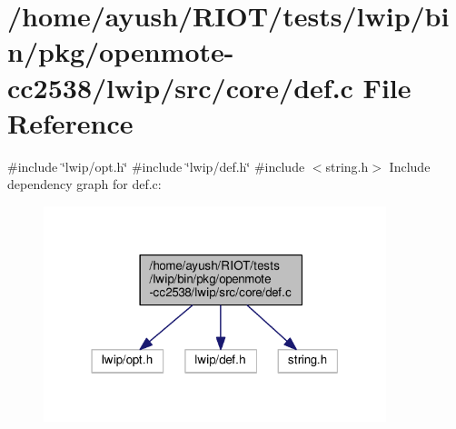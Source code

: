 \hypertarget{openmote-cc2538_2lwip_2src_2core_2def_8c}{}\section{/home/ayush/\+R\+I\+O\+T/tests/lwip/bin/pkg/openmote-\/cc2538/lwip/src/core/def.c File Reference}
\label{openmote-cc2538_2lwip_2src_2core_2def_8c}
{\ttfamily \#include \char`\"{}lwip/opt.\+h\char`\"{}}\newline
{\ttfamily \#include \char`\"{}lwip/def.\+h\char`\"{}}\newline
{\ttfamily \#include $<$string.\+h$>$}\newline
Include dependency graph for def.\+c\+:
\nopagebreak
\begin{figure}[H]
\begin{center}
\leavevmode
\includegraphics[width=283pt]{openmote-cc2538_2lwip_2src_2core_2def_8c__incl}
\end{center}
\end{figure}
